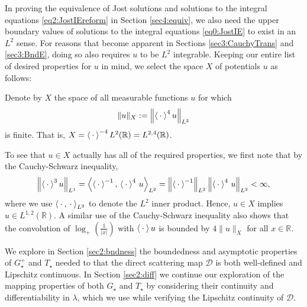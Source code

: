 \documentclass[../dissertation.tex]{subfiles}
\begin{document}
In proving the equivalence of Jost solutions and solutions to the 
integral equations \ref{eq2:JostIEreform} in Section \ref{sec4:equiv}, 
we also need the upper boundary values of solutions to the integral equations
\ref{eq0:JostIE} to exist in an $L^2$ sense. For reasons that become 
apparent in Sections \ref{sec3:CauchyTrans} and \ref{sec3:BndE}, doing so 
also requires $u$ to be $L^2$ integrable. Keeping our entire list
of desired properties for $u$ in mind, we select the space $X$ of potentials
$u$ as follows:

\begin{defn}\label{defn2:X}
	Denote by $X$ the space of all measurable functions $u$ for which
	\[
		\|u\|_X 
			:= \left\| \left\langle \kern 0.5ex \cdot \kern 0.5ex \right\rangle^4 u \right\|_{L^2}
	\]
	is finite. That is, $X = \left\langle \kern 0.5ex \cdot \kern 0.5ex \right\rangle^{-4} L^2(\mathbb R) 
	= L^{2,4}(\mathbb R)$.
\end{defn}

\begin{rmk}\label{rmk2:PostX}
	To see that $u \in X$ actually has all of the required properties, 
	we first note that by the Cauchy-Schwarz inequality, 
	\begin{align*}
		\left\|  \left\langle \kern 0.5ex \cdot \kern 0.5ex \right\rangle^3 u  \right\|_{L^1}
			= \left\langle \left\langle \kern 0.5ex \cdot \kern 0.5ex \right\rangle^{-1}, \, \left\langle \kern 0.5ex \cdot \kern 0.5ex \right\rangle^4 \, u  \right\rangle_{L^2}
			= \left\| \left\langle \kern 0.5ex \cdot \kern 0.5ex \right\rangle^{-1} \right\|_{L^2}
				\left\| \left\langle \kern 0.5ex \cdot \kern 0.5ex \right\rangle^{4} \, u \right\|_{L^2}
			< \infty,
	\end{align*}
	where we use $\left\langle \kern 0.5ex \cdot \kern 0.5ex, \kern 0.5ex \cdot \kern 0.5ex  \right\rangle_{L^2}$ to denote the $L^2$ inner
	product. Hence, $u \in X$ implies $u \in L^{1,2}(\mathbb R)$. A similar
	use of the Cauchy-Schwarz inequality also shows that the convolution 
	of $\log_+\left(\frac{1}{|x|}\right)$ with $\left\langle \kern 0.5ex \cdot \kern 0.5ex \right\rangle u$ is bounded
	by $4 \|u\|_X$ for all $x \in \mathbb R$. 
\end{rmk}



We explore in Section \ref{sec2:bndness} the boundedness and asymptotic 
properties of $G_\star^+$ and $T_\star$ needed to that the direct scattering 
map
$\mathscr D$ is both well-defined and Lipschitz continuous. In Section
\ref{sec2:diff} we continue our exploration of the mapping properties
of both $G_\star$ and $T_\star$ by considering their continuity and 
differentiability in $\lambda$, which we use while verifying the 
Lipschitz continuity of $\mathscr D$.
\end{document}

